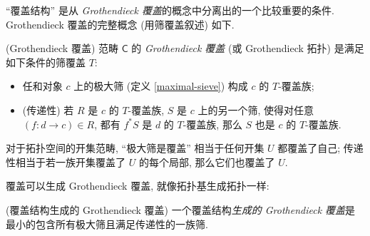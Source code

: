 
``覆盖结构'' 是从 \emph{Grothendieck 覆盖}的概念中分离出的一个比较重要的条件. Grothendieck 覆盖的完整概念 (用筛覆盖叙述) 如下.

\begin{definition}
	[label={Grothendieck-topology}]
	{(Grothendieck 覆盖)}
	范畴 $\mathsf C$ 的 \emph{Grothendieck 覆盖} (或 Grothendieck 拓扑) 是满足如下条件的筛覆盖 $T$:
	\begin{itemize}
		\item 任和对象 $c$ 上的极大筛 (定义 \ref{maximal-sieve}) 构成 $c$ 的 $T$-覆盖族;
		\item (传递性) 若 $R$ 是 $c$ 的 $T$-覆盖族, $S$ 是 $c$ 上的另一个筛, 使得对任意 $(f\colon d\to c)\in R$, 都有 $f^*S$ 是 $d$ 的 $T$-覆盖族, 那么 $S$ 也是 $c$ 的 $T$-覆盖族.
	\end{itemize}
\end{definition}

对于拓扑空间的开集范畴, ``极大筛是覆盖'' 相当于任何开集 $U$ 都覆盖了自己; 传递性相当于若一族开集覆盖了 $U$ 的每个局部, 那么它们也覆盖了 $U$.

%	

覆盖可以生成 Grothendieck 覆盖, 就像拓扑基生成拓扑一样:

\begin{definition}
	{(覆盖结构生成的 Grothendieck 覆盖)}
	一个覆盖结构\emph{生成的 Grothendieck 覆盖}是最小的包含所有极大筛且满足传递性的一族筛.
	
%		
\end{definition}


%

